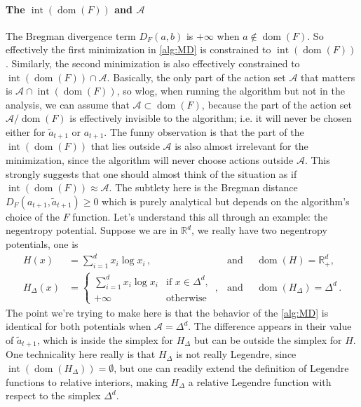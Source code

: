 \documentclass{article}
\theoremstyle{plain}
\theoremstyle{definition}
\newcommand{\dom}[1]{\operatorname{dom}(#1)}
\newcommand{\R}{\mathbb R}
\newcommand{\cA}{\mathcal A}
\newcommand{\interior}{\operatorname{int}}
\newcommand{\ta}{\tilde{a}}
\begin{document}
\paragraph{The $\interior(\dom{F})$ and $\cA$}
The Bregman divergence term $D_F(a, b)$ is $+\infty$ when $a \notin \dom{F}$.
So effectively the first minimization in \cref{alg:MD} is constrained to $\interior(\dom{F})$.
Similarly, the second minimization is also effectively constrained to $\interior(\dom{F}) \cap \cA$.
Basically, the only part of the action set $\cA$ that matters is $\cA \cap \interior(\dom{F})$,
so wlog, when running the algorithm but not in the analysis, we can assume that $\cA \subset \dom{F}$,
because the part of the action set $\cA/\dom{F}$ is effectively invisible to the algorithm; i.e. it will never be chosen either for $\ta_{t+1}$ or $a_{t+1}$.
The funny observation is that the part of the $\interior(\dom{F})$ that lies outside $\cA$
is also almost irrelevant for the minimization, since the algorithm will never choose actions outside $\cA$.
This strongly suggests that one should almost think of the situation as if $\interior(\dom{F}) \approx \cA$.
The subtlety here is the Bregman distance $D_F(a_{t+1}, \ta_{t+1})\geq 0$ which is purely analytical but depends on the algorithm's choice of the $F$ function.
Let's understand this all through an example: the negentropy potential.
Suppose we are in $\R^d$, we really have two negentropy potentials, one is
\begin{align}
    H(x)        & = \sum_{i=1}^{d} x_i \log x_i\,,                            & \text{and }\quad \dom{H} = \R_+^d, \\
    H_\Delta(x) & = \begin{cases}
                        \sum_{i=1}^{d} x_i \log x_i & \text{if } x \in \Delta^d, \\
                        +\infty                     & \text{otherwise}
                    \end{cases}\,, & \text{and }\quad \dom{H_\Delta} = \Delta^d\,.
\end{align}
The point we're trying to make here is that the behavior of the \cref{alg:MD} is identical for both potentials when $\cA = \Delta^d$.
The difference appears in their value of $\ta_{t+1}$, which is inside the simplex for $H_\Delta$ but can be outside the simplex for $H$.
One technicality here really is that $H_\Delta$ is not really Legendre, since $\interior(\dom{H_\Delta}) = \emptyset$,
but one can readily extend the definition of Legendre functions to relative interiors, making $H_\Delta$ a relative Legendre function with respect to the simplex $\Delta^d$.
\end{document}
